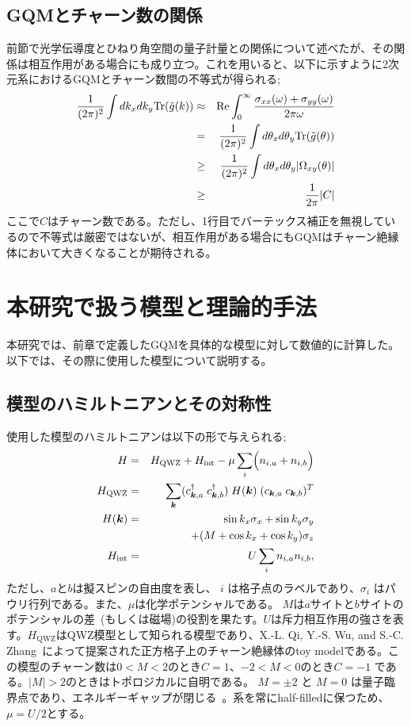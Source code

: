 \documentclass[12pt]{jsbook}
\newcommand{\bk}{\bm{k}}
\begin{document}
\section{GQMとチャーン数の関係}
前節で光学伝導度とひねり角空間の量子計量との関係について述べたが、その関係は相互作用がある場合にも成り立つ。これを用いると、以下に示すように2次元系におけるGQMとチャーン数間の不等式が得られる;
\begin{eqnarray}
    {1\over (2\pi)^2}\int dk_xdk_y \mathrm{Tr}(\tilde{g}(k))&\approx& \mathrm{Re}\int_0^\infty {\sigma_{xx}(\omega) + \sigma_{yy}(\omega)\over 2\pi\omega}\nonumber\\
    &=&{1\over (2\pi)^2}\int d\theta_xd\theta_y \mathrm{Tr}(\tilde{g}(\theta))\nonumber\\
    &\geq& {1\over (2\pi)^2}\int d\theta_xd\theta_y |\Omega_{xy}(\theta)|\nonumber\\
    &\geq& {1\over 2\pi}|C|
\end{eqnarray}
ここで$C$はチャーン数である。ただし、1行目でバーテックス補正を無視しているので不等式は厳密ではないが、相互作用がある場合にもGQMはチャーン絶縁体において大きくなることが期待される。
\chapter{本研究で扱う模型と理論的手法}
本研究では、前章で定義したGQMを具体的な模型に対して数値的に計算した。以下では、その際に使用した模型について説明する。
\section{模型のハミルトニアンとその対称性}%
使用した模型のハミルトニアンは以下の形で与えられる;
\begin{eqnarray}
H &=& H_{\mathrm{QWZ}} + H_{\mathrm{int}}-\mu \displaystyle \sum_i \Bigl(n_{i,a}+n_{i,b}\Bigr)\\
H_{\mathrm{QWZ}} &=& \displaystyle \sum_{\bk} (c^{\dagger}_{\bk,a}\; c^{\dagger}_{\bk,b})\;H(\bk)\;(c_{\bk,a}\; c_{\bk,b})^{T}\\
H(\bk) &=& \sin k_x\sigma_x + \sin k_y\sigma_y \nonumber\\
&& \ \ \ + (M+\cos k_x +\cos k_y)\sigma_z\\
H_\mathrm{int} &=& U\displaystyle \sum_i n_{i,a}n_{i,b}, 
\end{eqnarray}
ただし、$a$と$b$は擬スピンの自由度を表し、 $i$ は格子点のラベルであり、$\sigma_i$ はパウリ行列である。また、$\mu$は化学ポテンシャルである。 $M$は$a$サイトと$b$サイトのポテンシャルの差~\cite{asboth2016short}(もしくは磁場)の役割を果たす。$U$は斥力相互作用の強さを表す。$H_\mathrm{QWZ}$はQWZ模型として知られる模型であり、X.-L. Qi, Y.-S. Wu, and S.-C. Zhang~\cite{PhysRevB.74.085308,asboth2016short}によって提案された正方格子上のチャーン絶縁体のtoy modelである。この模型のチャーン数は$0 < M < 2$のとき$C=1$、$-2 < M < 0$のとき$C=-1$ である。$\vert M\vert >2$のときはトポロジカルに自明である。 $M=\pm 2$ と $M=0$ は量子臨界点であり、エネルギーギャップが閉じる~\cite{asboth2016short}。系を常にhalf-filledに保つため、$\mu=U/2$とする。
\end{document}
